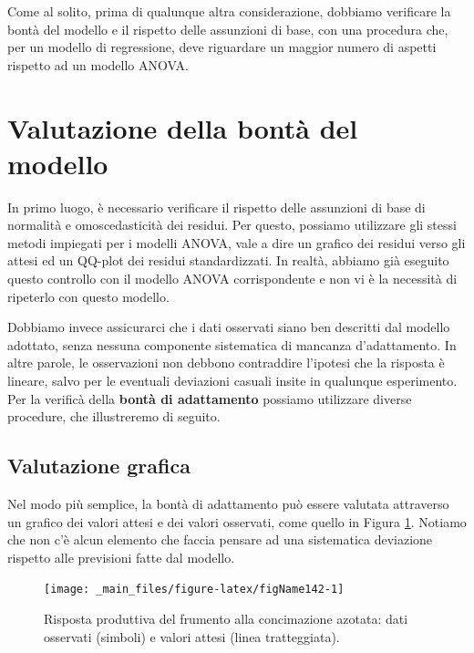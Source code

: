 \documentclass[a4paper,12pt,oneside]{book}
\begin{document}
Come al solito, prima di qualunque altra considerazione, dobbiamo verificare la bontà del modello e il rispetto delle assunzioni di base, con una procedura che, per un modello di regressione, deve riguardare un maggior numero di aspetti rispetto ad un modello ANOVA.

\hypertarget{valutazione-della-bonta-del-modello}{%
\section{Valutazione della bontà del modello}\label{valutazione-della-bonta-del-modello}}

In primo luogo, è necessario verificare il rispetto delle assunzioni di base di normalità e omoscedasticità dei residui. Per questo, possiamo utilizzare gli stessi metodi impiegati per i modelli ANOVA, vale a dire un grafico dei residui verso gli attesi ed un QQ-plot dei residui standardizzati. In realtà, abbiamo già eseguito questo controllo con il modello ANOVA corrispondente e non vi è la necessità di ripeterlo con questo modello.

Dobbiamo invece assicurarci che i dati osservati siano ben descritti dal modello adottato, senza nessuna componente sistematica di mancanza d'adattamento. In altre parole, le osservazioni non debbono contraddire l'ipotesi che la risposta è lineare, salvo per le eventuali deviazioni casuali insite in qualunque esperimento. Per la verificà della \textbf{bontà di adattamento} possiamo utilizzare diverse procedure, che illustreremo di seguito.

\hypertarget{valutazione-grafica}{%
\subsection{Valutazione grafica}\label{valutazione-grafica}}

Nel modo più semplice, la bontà di adattamento può essere valutata attraverso un grafico dei valori attesi e dei valori osservati, come quello in Figura \ref{fig:figName142}. Notiamo che non c'è alcun elemento che faccia pensare ad una sistematica deviazione rispetto alle previsioni fatte dal modello.

\begin{figure}

{\centering \texttt{[image: \_main\_files/figure-latex/figName142-1]} 

}

\caption{Risposta produttiva del frumento alla concimazione azotata: dati osservati (simboli) e valori attesi (linea tratteggiata).}\label{fig:figName142}
\end{figure}
\end{document}
